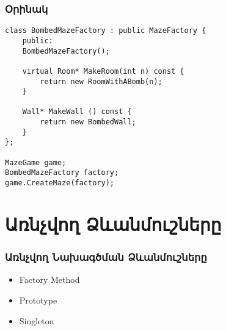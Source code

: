 \documentclass{beamer}
\begin{document}
\begin{frame}[fragile]\frametitle{Օրինակ}
\begin{english}
\begin{verbatim}
class BombedMazeFactory : public MazeFactory {
    public:
    BombedMazeFactory();

    virtual Room* MakeRoom(int n) const {
        return new RoomWithABomb(n);
    }

    Wall* MakeWall () const {
        return new BombedWall;
    }
};

MazeGame game;
BombedMazeFactory factory;
game.CreateMaze(factory);
\end{verbatim}
\end{english}
\end{frame}

\section{Առնչվող Ձևանմուշները}
\begin{frame}\frametitle{Առնչվող Նախագծման Ձևանմուշները}
\begin{itemize}
    \item Factory Method \vfill
    \item Prototype \vfill
    \item Singleton
\end{itemize}
\end{frame}
\end{document}
